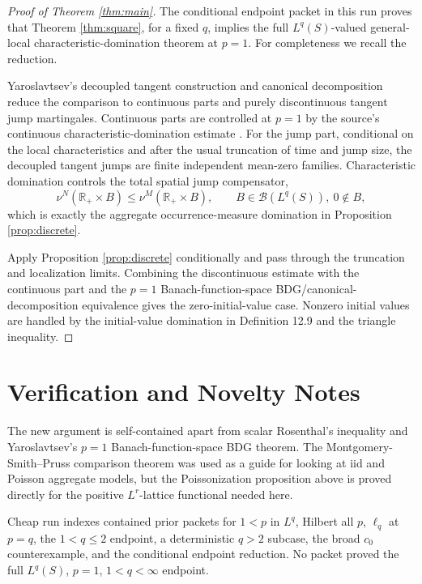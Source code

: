 \documentclass[11pt]{article}
\newcommand{\R}{\mathbb R}
\newcommand{\cB}{\mathcal B}
\begin{document}
\begin{proof}[Proof of Theorem \ref{thm:main}]
The conditional endpoint packet in this run proves that Theorem
\ref{thm:square}, for a fixed \(q\), implies the full \(L^q(S)\)-valued
general-local characteristic-domination theorem at \(p=1\).  For completeness
we recall the reduction.

Yaroslavtsev's decoupled tangent construction and canonical decomposition
reduce the comparison to continuous parts and purely discontinuous tangent
jump martingales.  Continuous parts are controlled at \(p=1\) by the source's
continuous characteristic-domination estimate \cite[Proposition 12.6]{Yaroslavtsev2019}.
For the jump part, conditional on the local characteristics and after the
usual truncation of time and jump size, the decoupled tangent jumps are finite
independent mean-zero families.  Characteristic domination controls the total
spatial jump compensator,
\[
  \nu^N(\R_+\times B)\le \nu^M(\R_+\times B),
  \qquad B\in\cB(L^q(S)),\ 0\notin B,
\]
which is exactly the aggregate occurrence-measure domination in Proposition
\ref{prop:discrete}.

Apply Proposition \ref{prop:discrete} conditionally and pass through the
truncation and localization limits.  Combining the discontinuous estimate
with the continuous part and the \(p=1\) Banach-function-space
BDG/canonical-decomposition equivalence \cite[Section 4.3]{Yaroslavtsev2018}
gives the zero-initial-value case.  Nonzero initial values are handled by the
initial-value domination in Definition 12.9 and the triangle inequality.
\end{proof}

\section*{Verification and Novelty Notes}

The new argument is self-contained apart from scalar Rosenthal's inequality
and Yaroslavtsev's \(p=1\) Banach-function-space BDG theorem.  The
Montgomery-Smith--Pruss comparison theorem \cite{MontgomerySmithPruss} was
used as a guide for looking at iid and Poisson aggregate models, but the
Poissonization proposition above is proved directly for the positive
\(L^r\)-lattice functional needed here.

Cheap run indexes contained prior packets for \(1<p\) in \(L^q\), Hilbert all
\(p\), \(\ell_q\) at \(p=q\), the \(1<q\le2\) endpoint, a deterministic
\(q>2\) subcase, the broad \(c_0\) counterexample, and the conditional
endpoint reduction.  No packet proved the full \(L^q(S)\), \(p=1\),
\(1<q<\infty\) endpoint.
\end{document}
